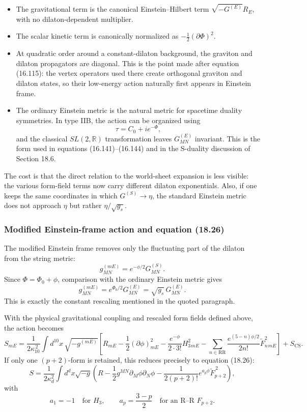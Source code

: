 \documentclass[
  10pt,
  a4paper,
  openany]{book}
\providecommand{\tightlist}{%
  \setlength{\itemsep}{0pt}\setlength{\parskip}{0pt}}
\begin{document}
\begin{itemize}
\tightlist
\item
  The gravitational term is the canonical Einstein--Hilbert term
  \(\sqrt{-G^{(E)}}R_E\), with no dilaton-dependent multiplier.
\item
  The scalar kinetic term is canonically normalized as
  \(-\frac12(\partial\Phi)^2\).
\item
  At quadratic order around a constant-dilaton background, the graviton
  and dilaton propagators are diagonal. This is the point made after
  equation (16.115): the vertex operators used there create orthogonal
  graviton and dilaton states, so their low-energy action naturally
  first appears in Einstein frame.
\item
  The ordinary Einstein metric is the natural metric for spacetime
  duality symmetries. In type IIB, the action can be organized using \[
  \tau=C_0+ie^{-\Phi},
  \] and the classical \(SL(2,\mathbb R)\) transformation leaves
  \(G^{(E)}_{MN}\) invariant. This is the form used in equations
  (16.141)--(16.144) and in the S-duality discussion of Section 18.6.
\end{itemize}

The cost is that the direct relation to the world-sheet expansion is
less visible: the various form-field terms now carry different dilaton
exponentials. Also, if one keeps the same coordinates in which
\(G^{(S)}\to\eta\), the standard Einstein metric does not approach
\(\eta\) but rather \(\eta/\sqrt{g_s}\).

\subsubsection{Modified Einstein-frame action and equation
(18.26)}\label{modified-einstein-frame-action-and-equation-18.26}

The modified Einstein frame removes only the fluctuating part of the
dilaton from the string metric: \[
\boxed{
g^{(mE)}_{MN}=e^{-\phi/2}G^{(S)}_{MN}
}.
\] Since \(\Phi=\Phi_0+\phi\), comparison with the ordinary Einstein
metric gives \[
g^{(mE)}_{MN}
=e^{\Phi_0/2}G^{(E)}_{MN}
=\sqrt{g_s}\,G^{(E)}_{MN}.
\] This is exactly the constant rescaling mentioned in the quoted
paragraph.

With the physical gravitational coupling and rescaled form fields
defined above, the action becomes \[
S_{mE}
=\frac1{2\kappa_{10}^{\,2}}
\int d^{10}x\,\sqrt{-g^{(mE)}}
\left[
R_{mE}
-\frac12(\partial\phi)^2_{mE}
-\frac{e^{-\phi}}{2\cdot3!}H_3^2{}_{mE}
-\sum_{n\in\mathrm{RR}}
\frac{e^{(5-n)\phi/2}}{2n!}\widetilde F_n^2{}_{mE}
\right]
+S_{\mathrm{CS}}.
\] If only one \((p+2)\)-form is retained, this reduces precisely to
equation (18.26): \[
\boxed{
S
=\frac1{2\kappa_d^2}
\int d^dx\sqrt{-g}
\left(
R-\frac12g^{MN}\partial_M\phi\partial_N\phi
-\frac1{2(p+2)!}e^{a_p\phi}\widetilde F_{p+2}^{\,2}
\right)
},
\] with \[
a_1=-1\quad\text{for }H_3,
\qquad
a_p=\frac{3-p}{2}\quad\text{for an R--R }F_{p+2}.
\]
\end{document}
